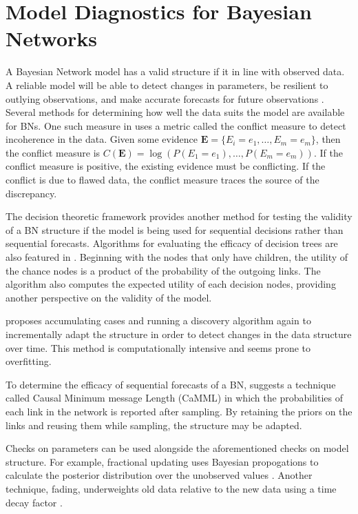 \documentclass[12pt]{article}
\begin{document}
\section{Model Diagnostics for Bayesian Networks}

A Bayesian Network model has a valid structure if it in line with observed data. A reliable model will be able to detect changes in parameters, be resilient to outlying observations, and make accurate forecasts for future observations \cite{Dawid1984}. 
Several methods for determining how well the data suits the model are available for BNs. One such measure in \cite{KORB} uses a metric called the conflict measure to detect incoherence in the data. Given some evidence $\bm{E}=\{E_i=e_1,\ldots,E_m=e_m\}$, then the conflict measure is $C(\bm{E})=\log(P(E_1=e_1),\ldots,P(E_m=e_m))$. If the conflict measure is positive, the existing evidence must be conflicting. If the conflict is due to flawed data, the conflict measure traces the source of the discrepancy. 

The decision theoretic framework provides another method for testing the validity of a BN structure if the model is being used for sequential decisions rather than sequential forecasts. Algorithms for evaluating the efficacy of decision trees are also featured in \cite{KORB}. Beginning with the nodes that only have children, the utility of the chance nodes is a product of the probability of the outgoing links. The algorithm also computes the expected utility of each decision nodes, providing another perspective on the validity of the model.

\cite{JENSEN} proposes accumulating cases and running a discovery algorithm again to incrementally adapt the structure in order to detect changes in the data structure over time. This method is computationally intensive and seems prone to overfitting. 

To determine the efficacy of sequential forecasts of a BN, \cite{KORB}  suggests a technique called Causal Minimum message Length (CaMML) in which the probabilities of each link in the network is reported after sampling. By retaining the priors on the links and reusing them while sampling, the structure may be adapted. 

Checks on parameters can be used alongside the aforementioned checks on model structure. For example, fractional updating uses Bayesian propogations to calculate the posterior distribution over the unobserved values \cite{Spiegelhalter and Lauritzen}.  Another technique, fading, underweights old data relative to the new data using a time decay factor \cite{JENSEN}. 
\end{document}
